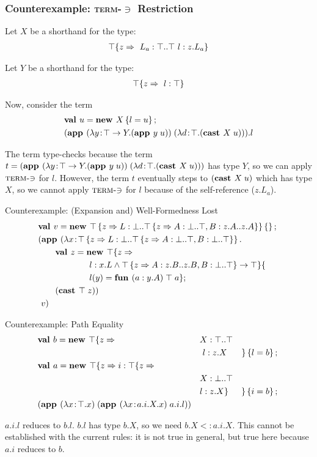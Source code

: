 \documentclass{beamer}
\begin{document}
\begin{frame}[fragile]
\frametitle{Counterexample: \texorpdfstring{\textsc{term-$\ni$}}{Term-Mem} Restriction}
Let $X$ be a shorthand for the type:
\begin{align*}
\top \{z \Rightarrow 
\ L_a : \top..\top
\ l : z.L_a
 \}
\end{align*}

Let $Y$ be a shorthand for the type:
\begin{align*}
\top \{z \Rightarrow 
\ l : \top
 \}
\end{align*}

Now, consider the term
\begin{align*}
&\mlnew u {X \ldefs{ l = u }}{
\app {(\abs y {\Top \tfun Y} {\app y u})} {(\abs d \Top {\cast X u})}.l
}
\end{align*}

The term type-checks because the term $t=(\textbf{app }(\lambda y\!:\!\top \rightarrow Y.(\textbf{app }y\;u))\;(\lambda d\!:\!\top.(\textbf{cast }X\;u)))$ has type
$Y$, so we can apply $\textsc{term-$\ni$}$ for $l$. However, the term
$t$ eventually steps to ${(\textbf{cast }X\;u)}$ which has type $X$,
so we cannot apply $\textsc{term-$\ni$}$ for $l$ because of the
self-reference ($z.L_a$).
\end{frame}

\begin{frame}[fragile]{Counterexample: (Expansion and) Well-Formedness Lost}
\begin{align*}
&\textbf{val }v = \textbf{new }\top \left\{z \Rightarrow L : \bot..\top \left\{z \Rightarrow A : \bot..\top, B : z.A..z.A \right\} \right\} \left\{\right\} ;\;\\&
(\textbf{app }(\lambda x\!:\!\top \left\{z \Rightarrow L : \bot..\top \left\{z \Rightarrow A : \bot..\top, B : \bot..\top \right\} \right\}.\\&\quad\quad
\textbf{val }z = \textbf{new }\top \{z \Rightarrow \\&\quad\quad\quad\quad\quad\quad
l : x.L \wedge {\top\left\{z \Rightarrow A : z.B..z.B, B : \bot..\top\right\}} \rightarrow \top \}\{\\&\quad\quad\quad\quad\quad\quad
l(y) = \textbf{fun } (a:y.A)\;\top\;a\} ;\;\\&
\quad\quad (\textbf{cast }\top\;z)
)\;\\&\ v)
\end{align*}
\end{frame}

\begin{frame}[fragile]{Counterexample: Path Equality}
\begin{align*}
&\textbf{val }b = \textbf{new }\top \{z \Rightarrow &&X : \top..\top&\\
&&&\ l : z.X& \}\left\{l = b\right\} ;\;\\&
\textbf{val }a = \textbf{new }\top \{z \Rightarrow i : \top \{z \Rightarrow &&&\\
&&&X : \bot..\top\\
&&&l : z.X \}& \}\left\{i = b\right\} ;\;\\&
(\textbf{app }(\lambda x\!:\!\top.x)\;(\textbf{app }(\lambda x\!:\!a.i.X.x)\;a.i.l))
\end{align*}

$a.i.l$ reduces to $b.l$. $b.l$ has type $b.X$, so we need $b.X <:
a.i.X$. This cannot be established with the current rules: it is not
true in general, but true here because $a.i$ reduces to $b$.
\end{frame}
\end{document}
